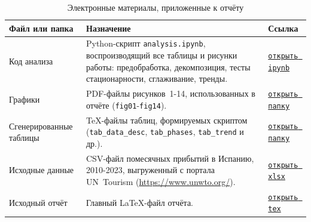 \documentclass[a4paper,14pt]{extarticle}
\begin{document}
\begin{table}[H]
\centering
\caption{Электронные материалы, приложенные к отчёту}
\label{tab:digital_appendix}
{\small
\setlength{\tabcolsep}{3.2pt}
\renewcommand{\arraystretch}{1.18}
\begin{tabular}{L{4.6cm}L{5.6cm}L{3.3cm}}
\toprule
Файл или папка & Назначение & Ссылка \\
\midrule
Код анализа &
Python-скрипт \texttt{analysis.ipynb}, воспроизводящий все
таблицы и рисунки работы: предобработка, декомпозиция,
тесты стационарности, сглаживание, тренды. &
\href{https://github.com/Echways/SPoI/blob/main/lab-4/src/analysis.ipynb}{\texttt{открыть ipynb}} \\
Графики &
PDF-файлы рисунков~1-14, использованных в отчёте
(\texttt{fig01}-\texttt{fig14}). &
\href{https://github.com/Echways/SPoI/tree/main/lab-4/assets}{\texttt{открыть папку}} \\
Сгенерированные таблицы &
TeX-файлы таблиц, формируемых скриптом
(\texttt{tab\_data\_desc}, \texttt{tab\_phases},
\texttt{tab\_trend} и др.). &
\href{https://github.com/Echways/SPoI/tree/main/lab-4/generated}{\texttt{открыть папку}} \\
Исходные данные &
CSV-файл помесячных прибытий в Испанию, 2010-2023,
выгруженный с портала UN~Tourism
(\url{https://www.unwto.org/}). &
\href{https://github.com/Echways/SPoI/blob/main/lab-4/data/data.xlsx}{\texttt{открыть xlsx}} \\
Исходный отчёт &
Главный LaTeX-файл отчёта. &
\href{https://github.com/Echways/SPoI/blob/main/lab-4/report.tex}{\texttt{открыть tex}} \\
\bottomrule
\end{tabular}}
\end{table}
\end{document}
